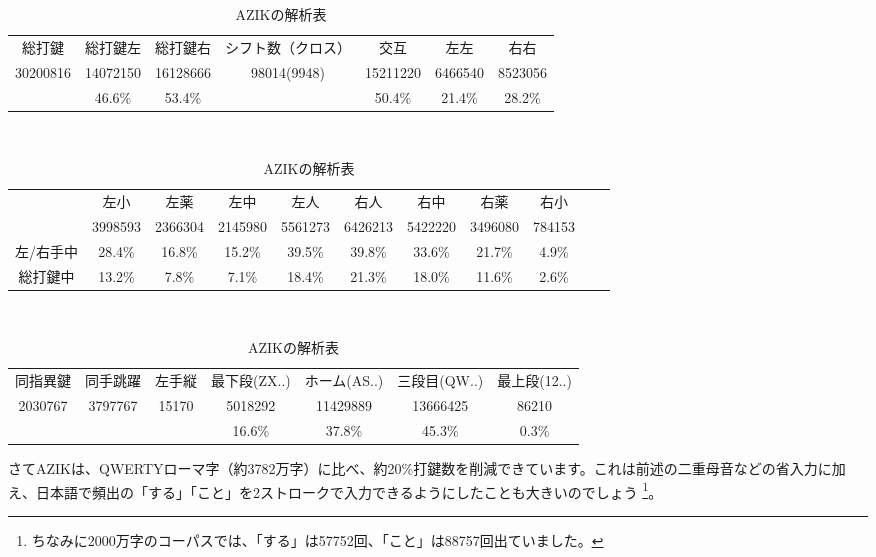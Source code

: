 \begin{table}[htbp]
 \caption{AZIKの解析表}
 \begin{center}
 \begin{tabular}{cccc|ccc}
 \hline
総打鍵 & 総打鍵左 & 総打鍵右 & シフト数（クロス） & 交互 & 左左 & 右右 \\
30200816 & 14072150 & 16128666 & 98014(9948) & 15211220 & 6466540 & 8523056 \\
 & 46.6\% & 53.4\% &  & 50.4\% & 21.4\% & 28.2\% \\
 \hline
 \end{tabular}

 　\vspace{1zw}　

 \begin{tabular}{ccccccccccc}
 \hline
& 左小 & 左薬 & 左中 & 左人 & 右人 & 右中 & 右薬 & 右小 \\
& 3998593 & 2366304 & 2145980 & 5561273 & 6426213 & 5422220 & 3496080 & 784153 \\
左/右手中 & 28.4\% & 16.8\% & 15.2\% & 39.5\% & 39.8\% & 33.6\% & 21.7\% & 4.9\% \\
総打鍵中 & 13.2\% & 7.8\% & 7.1\% & 18.4\% & 21.3\% & 18.0\% & 11.6\% & 2.6\% \\
\hline
 \end{tabular}

 　\vspace{1zw}　

 \begin{tabular}{ccc|cccc}
 \hline
 同指異鍵 & 同手跳躍 & 左手縦 & 最下段(ZX..) & ホーム(AS..) & 三段目(QW..) & 最上段(12..)\\
2030767 & 3797767 & 15170 & 5018292 & 11429889 & 13666425 & 86210 \\
 &  &  & 16.6\% & 37.8\% & 45.3\% & 0.3\% \\
\hline
 \end{tabular}
 \end{center}
 \label{tbl:azik}
\end{table}

さてAZIKは、QWERTYローマ字（約3782万字）に比べ、約20\%打鍵数を削減できています。これは前述の二重母音などの省入力に加え、日本語で頻出の「する」「こと」を2ストロークで入力できるようにしたことも大きいのでしょう%
\footnote{ちなみに2000万字のコーパスでは、「する」は57752回、「こと」は88757回出ていました。}。

